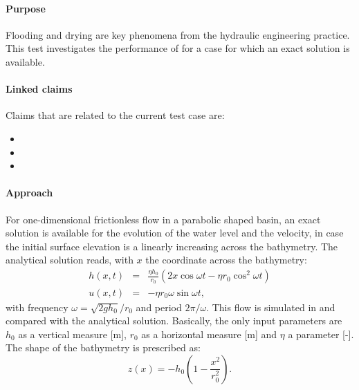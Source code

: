 



\paragraph*{Purpose}
Flooding and drying are key phenomena from the hydraulic engineering practice. This test investigates the performance of \DFLOWFM for a case for which an exact solution is available.



\paragraph*{Linked claims}
Claims that are related to the current test case are:
\begin{itemize}
\item {}
\item {}
\item {}
\end{itemize}



\paragraph*{Approach}
For one-dimensional frictionless flow in a parabolic shaped basin, an exact solution is available for the evolution of the water level and the velocity, in case the initial surface elevation is a linearly increasing across the bathymetry. The analytical solution reads, with $x$ the coordinate across the bathymetry:
\begin{eqnarray*}
h(x,t)   &=& \frac{\eta h_0}{r_0} \left(2 x \cos \omega t - \eta r_0 \cos^2 \omega t  \right) \\
u(x,t)   &=& -\eta r_0 \omega \sin \omega t,
\end{eqnarray*}
with frequency $\omega = \sqrt{2gh_0}/r_0$ and period $2\pi/\omega$. This flow is simulated in \DFLOWFM and compared with the analytical solution. Basically, the only input parameters are $h_0$ as a vertical measure [m], $r_0$ as a horizontal measure [m] and $\eta$ a parameter [-]. The shape of the bathymetry is prescribed as:
\begin{equation*}
z(x) = -h_0 \left( 1-\frac{x^2}{r_0^2}  \right).
\end{equation*}



